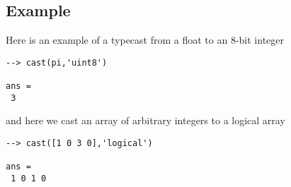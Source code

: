 \subsection{Example}

Here is an example of a typecast from a float to an 8-bit integer
\begin{verbatim}
--> cast(pi,'uint8')

ans = 
 3 
\end{verbatim}
and here we cast an array of arbitrary integers to a logical array
\begin{verbatim}
--> cast([1 0 3 0],'logical')

ans = 
 1 0 1 0 
\end{verbatim}
